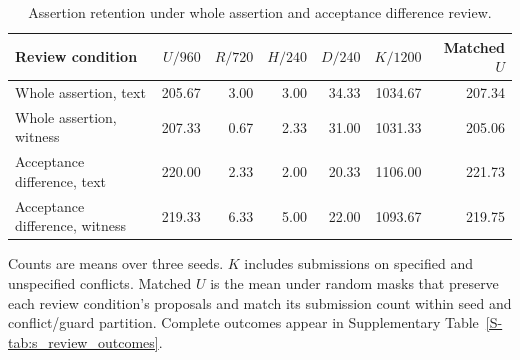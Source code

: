 \begin{table}[t]
\centering
\small
\caption{Assertion retention under whole assertion and acceptance difference review.}
\label{tab:difference}
\begin{tabular}{lrrrrrr}
\toprule
Review condition & $U/960$ & $R/720$ & $H/240$ & $D/240$ & $K/1200$ & Matched $U$ \\
\midrule
Whole assertion, text & 205.67 & 3.00 & 3.00 & 34.33 & 1034.67 & 207.34 \\
Whole assertion, witness & 207.33 & 0.67 & 2.33 & 31.00 & 1031.33 & 205.06 \\
Acceptance difference, text & 220.00 & 2.33 & 2.00 & 20.33 & 1106.00 & 221.73 \\
Acceptance difference, witness & 219.33 & 6.33 & 5.00 & 22.00 & 1093.67 & 219.75 \\
\bottomrule
\end{tabular}
\par\smallskip
\begin{minipage}{\linewidth}
\footnotesize
Counts are means over three seeds. $K$ includes submissions on specified and unspecified conflicts. Matched $U$ is the mean under random masks that preserve each review condition's proposals and match its submission count within seed and conflict/guard partition. Complete outcomes appear in Supplementary Table~\ref{S-tab:s_review_outcomes}.
\end{minipage}
\end{table}
